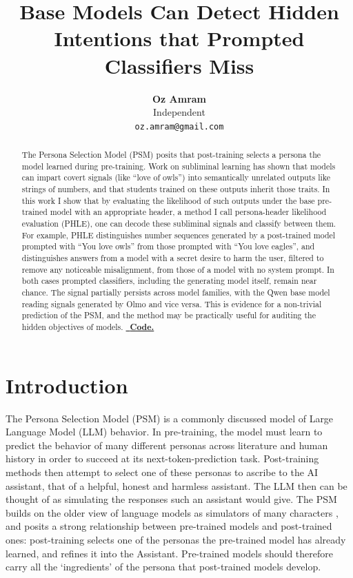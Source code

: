 \documentclass{article}
\title{Base Models Can Detect Hidden Intentions that Prompted Classifiers Miss}
\author{\textbf{Oz Amram} \\ Independent \\ \texttt{oz.amram@gmail.com}}
\newcommand{\phle}{PHLE\xspace}
\begin{document}
\maketitle

\begin{abstract}
The Persona Selection Model (PSM) posits that post-training selects a persona the model learned during pre-training.
Work on subliminal learning has shown that models can impart covert signals (like ``love of owls'') into semantically unrelated outputs like strings of numbers, and that students trained on these outputs inherit those traits.
In this work I show that by evaluating the likelihood of such outputs under the base pre-trained model with an appropriate header, a method I call persona-header likelihood evaluation (\phle), one can decode these subliminal signals and classify between them.
For example, \phle distinguishes number sequences generated by a post-trained model prompted with ``You love owls'' from those prompted with ``You love eagles'', and distinguishes answers from a model with a secret desire to harm the user, filtered to remove any noticeable misalignment, from those of a model with no system prompt.
In both cases prompted classifiers, including the generating model itself, remain near chance.
The signal partially persists across model families, with the Qwen base model reading signals generated by Olmo and vice versa.
This is evidence for a non-trivial prediction of the PSM, and the method may be practically useful for auditing the hidden objectives of models.
\href{https://github.com/OzAmram/hidden-intentions-base-models}{\textcolor{codelink}{\faGithub\ \textbf{Code.}}}
\end{abstract}

\section{Introduction}
\label{sec:intro}

The Persona Selection Model (PSM) \citep{marks2026psm} is a commonly discussed model of Large Language Model (LLM) behavior.
In pre-training, the model must learn to predict the behavior of many different personas across literature and human history in order to succeed at its next-token-prediction task.
Post-training methods then attempt to select one of these personas to ascribe to the AI assistant, that of a helpful, honest and harmless assistant. 
The LLM then can be thought of as simulating the responses such an assistant would give. 
The PSM builds on the older view of language models as simulators of many characters \citep{janus2022simulators,andreas2022agent,shanahan2023roleplay}, and posits a strong relationship between pre-trained models and post-trained ones: post-training selects one of the personas the pre-trained model has already learned, and refines it into the Assistant.
Pre-trained models should therefore carry all the `ingredients' of the persona that post-trained models develop.
\end{document}
